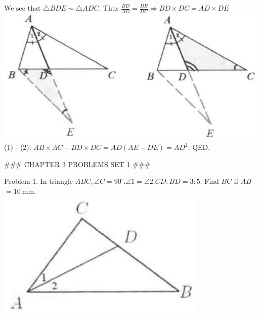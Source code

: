 \documentclass[10pt]{article}
\begin{document}
We see that \(\triangle B D E \sim \triangle A D C\). Thus \(\frac{B D}{A D}=\frac{D E}{D C} \Rightarrow B D \times D C=A D \times D E\)\\
\includegraphics[max width=\textwidth, center]{2025_04_17_97bc1f7e44d93c271a88g-063}\\
(1) - (2): \(A B \times A C-B D \times D C=A D(A E-D E)=A D^{2}\). QED.

### CHAPTER 3 PROBLEMS SET 1 ###

Problem 1. In triangle \(A B C, \angle C=90^{\circ} . \angle 1=\angle 2 . C D: B D=3: 5\). Find \(B C\) if \(A B\) \(=10 \mathrm{~mm}\).\\
\includegraphics[max width=\textwidth, center]{2025_04_17_97bc1f7e44d93c271a88g-064(1)}
\end{document}
